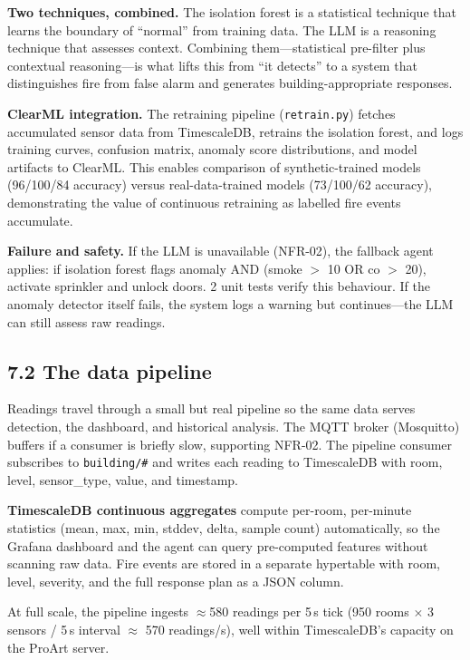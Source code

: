 \documentclass[11pt]{article}
\begin{document}
\textbf{Two techniques, combined.} The isolation forest is a statistical technique that learns the boundary of ``normal'' from training data. The LLM is a reasoning technique that assesses context. Combining them---statistical pre-filter plus contextual reasoning---is what lifts this from ``it detects'' to a system that distinguishes fire from false alarm and generates building-appropriate responses.

\textbf{ClearML integration.} The retraining pipeline (\texttt{retrain.py}) fetches accumulated sensor data from TimescaleDB, retrains the isolation forest, and logs training curves, confusion matrix, anomaly score distributions, and model artifacts to ClearML. This enables comparison of synthetic-trained models (96/100/84 accuracy) versus real-data-trained models (73/100/62 accuracy), demonstrating the value of continuous retraining as labelled fire events accumulate.

\textbf{Failure and safety.} If the LLM is unavailable (NFR-02), the fallback agent applies: if isolation forest flags anomaly AND (smoke $>$ 10 OR co $>$ 20), activate sprinkler and unlock doors. 2 unit tests verify this behaviour. If the anomaly detector itself fails, the system logs a warning but continues---the LLM can still assess raw readings.

\subsection{7.2 The data pipeline}

Readings travel through a small but real pipeline so the same data serves detection, the dashboard, and historical analysis. The MQTT broker (Mosquitto) buffers if a consumer is briefly slow, supporting NFR-02. The pipeline consumer subscribes to \texttt{building/\#} and writes each reading to TimescaleDB with room, level, sensor\_type, value, and timestamp.

\textbf{TimescaleDB continuous aggregates} compute per-room, per-minute statistics (mean, max, min, stddev, delta, sample count) automatically, so the Grafana dashboard and the agent can query pre-computed features without scanning raw data. Fire events are stored in a separate hypertable with room, level, severity, and the full response plan as a JSON column.

At full scale, the pipeline ingests $\approx$580 readings per 5\,s tick (950 rooms $\times$ 3 sensors / 5\,s interval $\approx$ 570 readings/s), well within TimescaleDB's capacity on the ProArt server.
\end{document}
